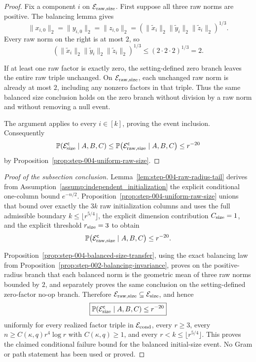 \begin{proof}
Fix a component \(i\) on
\(\mathcal E_{\rm raw,size}\). First suppose all three raw norms are
positive. The balancing lemma gives
\[
  \|x_{i,0}\|_2=\|y_{i,0}\|_2=\|z_{i,0}\|_2
  =\left(\|\widetilde x_i\|_2
          \|\widetilde y_i\|_2
          \|\widetilde z_i\|_2\right)^{1/3}.
\]
Every raw norm on the right is at most \(2\), so
\[
  \left(\|\widetilde x_i\|_2
          \|\widetilde y_i\|_2
          \|\widetilde z_i\|_2\right)^{1/3}
  \le (2\cdot2\cdot2)^{1/3}=2.
\]

If at least one raw factor is exactly zero, the setting-defined zero branch
leaves the entire raw triple unchanged. On
\(\mathcal E_{\rm raw,size}\), each unchanged raw norm is already at most
\(2\), including any nonzero factors in that triple. Thus the same balanced
size conclusion holds on the zero branch without division by a raw norm and
without removing a null event.

The argument applies to every \(i\in[k]\), proving the event inclusion.
Consequently
\[
  \mathbb P\!\left(\mathcal E_{\rm size}^{\mathsf c}\mid A,B,C\right)
  \le
  \mathbb P\!\left(\mathcal E_{\rm raw,size}^{\mathsf c}\mid A,B,C\right)
  \le r^{-20}
\]
by Proposition~\ref{prop:step-004-uniform-raw-size}. 

\end{proof}

\begin{proof}[Proof of the subsection conclusion]

Lemma~\ref{lem:step-004-raw-radius-tail} derives from
Assumption~\ref{assump:independent_initialization} the explicit conditional
one-column bound \(e^{-n/2}\). Proposition~\ref{prop:step-004-uniform-raw-size}
unions that bound over exactly the \(3k\) raw initialization columns and uses
the full admissible boundary \(k\le\lfloor r^{5/4}\rfloor\), the explicit
dimension contribution \(C_{\rm size}=1\), and the explicit threshold
\(r_{\rm size}=3\) to obtain
\[
  \mathbb P\!\left(\mathcal E_{\rm raw,size}^{\mathsf c}
    \mid A,B,C\right)\le r^{-20}.
\]

Proposition~\ref{prop:step-004-balanced-size-transfer}, using the exact
balancing law from Proposition~\ref{prop:step-002-balancing-invariance}, proves on the positive-radius branch
that each balanced norm is the geometric mean of three raw norms bounded by
\(2\), and separately proves the same conclusion on the setting-defined
zero-factor no-op branch. Therefore
\(\mathcal E_{\rm raw,size}\subseteq\mathcal E_{\rm size}\), and hence
\[
  \boxed{
  \mathbb P\!\left(\mathcal E_{\rm size}^{\mathsf c}
    \mid A,B,C\right)\le r^{-20}}
\]
uniformly for every realized factor triple in \(\mathcal E_{\rm cond}\),
every \(r\ge3\), every \(n\ge C(\kappa,q)r^4\log r\) with
\(C(\kappa,q)\ge1\), and every
\(r<k\le\lfloor r^{5/4}\rfloor\). This proves the claimed conditional
failure bound for the balanced initial-size event. No Gram or path statement
has been used or proved.

\end{proof}

